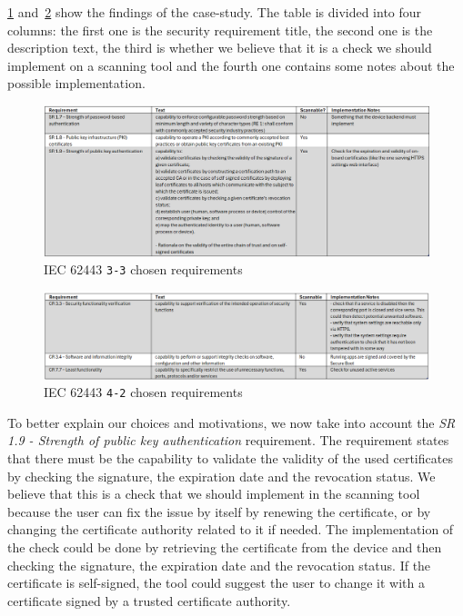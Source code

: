 \cref{fig:iec62443-findings-3_3} and~\cref{fig:iec62443-findings-4_2} show the findings of the case-study. The table is divided into four columns: the first one is the security requirement title, the second one is the description text, the third is whether we believe that it is a check we should implement on a scanning tool and the fourth one contains some notes about the possible implementation.

\begin{figure}[t]
  \centering
  \includegraphics[width=1.0\textwidth]{chapters/04/assets/iec62443-findings-3_3}
  \caption{IEC 62443 \texttt{3-3} chosen requirements}
  \label{fig:iec62443-findings-3_3}
\end{figure}

\begin{figure}[t]
  \centering
  \includegraphics[width=1.0\textwidth]{chapters/04/assets/iec62443-findings-4_2}
  \caption{IEC 62443 \texttt{4-2} chosen requirements}
  \label{fig:iec62443-findings-4_2}
\end{figure}

To better explain our choices and motivations, we now take into account the \textit{SR 1.9 - Strength of public key authentication} requirement. The requirement states that there must be the capability to validate the validity of the used certificates by checking the signature, the expiration date and the revocation status. We believe that this is a check that we should implement in the scanning tool because the user can fix the issue by itself by renewing the certificate, or by changing the certificate authority related to it if needed. The implementation of the check could be done by retrieving the certificate from the device and then checking the signature, the expiration date and the revocation status. If the certificate is self-signed, the tool could suggest the user to change it with a certificate signed by a trusted certificate authority.

